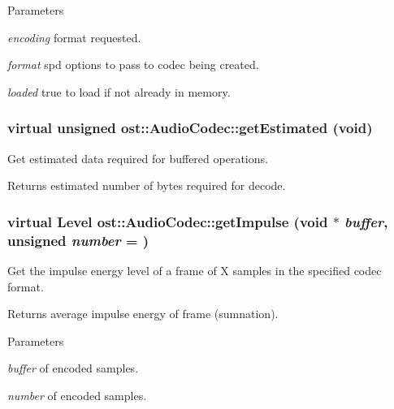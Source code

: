 \begin{DoxyParams}{Parameters}
\item[{\em encoding}]format requested. \item[{\em format}]spd options to pass to codec being created. \item[{\em loaded}]true to load if not already in memory. \end{DoxyParams}
\subsubsection[{getEstimated}]{\setlength{\rightskip}{0pt plus 5cm}virtual unsigned ost::AudioCodec::getEstimated (void)\hspace{0.3cm}{\ttfamily  [virtual]}}\label{classost_1_1_audio_codec_a0d02b2719ed4d628f2350aee72e789cc}


Get estimated data required for buffered operations. \begin{DoxyReturn}{Returns}
estimated number of bytes required for decode. 
\end{DoxyReturn}
\subsubsection[{getImpulse}]{\setlength{\rightskip}{0pt plus 5cm}virtual {\bf Level} ost::AudioCodec::getImpulse (void $\ast$ {\em buffer}, \/  unsigned {\em number} = {})\hspace{0.3cm}{\ttfamily  [virtual]}}\label{classost_1_1_audio_codec_a021a39d174853a4270f3f3775bfd634a}


Get the impulse energy level of a frame of X samples in the specified codec format. \begin{DoxyReturn}{Returns}
average impulse energy of frame (sumnation). 
\end{DoxyReturn}

\begin{DoxyParams}{Parameters}
\item[{\em buffer}]of encoded samples. \item[{\em number}]of encoded samples. \end{DoxyParams}
